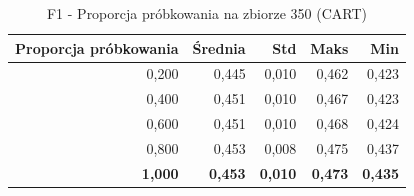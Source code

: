 \begin{table}[htbp]
\centering
\small
\setlength{\tabcolsep}{6pt}
\renewcommand{\arraystretch}{1.2}
\caption{F1 - Proporcja próbkowania na zbiorze 350 (CART)}
\label{tab:CART_sample_ratio_350_f1}
\begin{tabular}{r|r|r|r|r}
\toprule
Proporcja próbkowania & Średnia & Std & Maks & Min \\
\hline
0,200 & 0,445 & 0,010 & 0,462 & 0,423 \\
0,400 & 0,451 & 0,010 & 0,467 & 0,423 \\
0,600 & 0,451 & 0,010 & 0,468 & 0,424 \\
0,800 & 0,453 & 0,008 & 0,475 & 0,437 \\
\textbf{1,000} & \textbf{0,453} & \textbf{0,010} & \textbf{0,473} & \textbf{0,435} \\
\bottomrule
\end{tabular}
\end{table}
